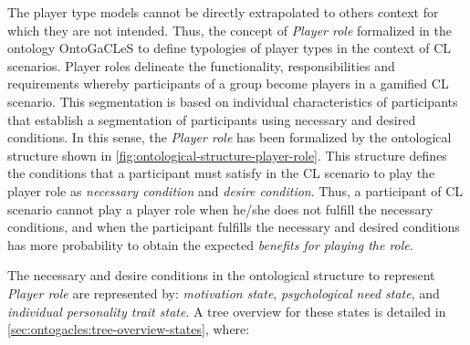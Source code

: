 The player type models cannot be directly extrapolated to others context for which they are not intended.
Thus, the concept of \emph{Player role} formalized in the ontology OntoGaCLeS to define typologies of player types in the context of CL scenarios.
Player roles delineate the functionality, responsibilities and requirements whereby participants of a group become players in a gamified CL scenario. This segmentation is based on individual characteristics of participants that establish a segmentation of participants using necessary and desired conditions.
In this sense, the \emph{Player role} has been formalized by the ontological structure shown in \autoref{fig:ontological-structure-player-role}.
This structure defines the conditions that a participant must satisfy in the CL scenario to play the player role as \emph{necessary condition} and \emph{desire condition}.
Thus, a participant of CL scenario cannot play a player role when he/she does not fulfill the necessary conditions, and when the participant fulfills the necessary and desired conditions has more probability to obtain the expected \emph{benefits for playing the role}.

The necessary and desire conditions in the ontological structure to represent \emph{Player role} are represented by: \emph{motivation state}, \emph{psychological need state}, and \emph{individual personality trait state}.
A tree overview for these states is detailed in \autoref{sec:ontogacles:tree-overview-states}, where:

